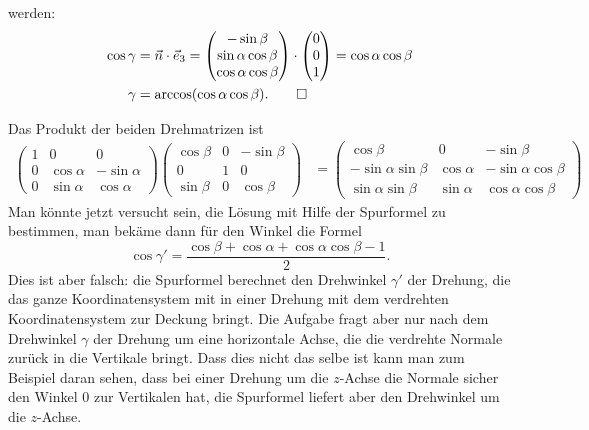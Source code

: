 \begin{loesung}
werden:
\begin{align*}
\cos\gamma
&=
\vec n\cdot\vec e_3=
\begin{pmatrix}
-\sin\beta\\
\sin\alpha\cos\beta\\
\cos\alpha\cos\beta
\end{pmatrix}
\cdot
\begin{pmatrix}0\\0\\1\end{pmatrix}=\cos\alpha\cos\beta
\\
\gamma&=\arccos(\cos\alpha\cos\beta).
\qedhere
\end{align*}
\end{loesung}

\begin{diskussion}
Das Produkt der beiden Drehmatrizen ist
\begin{align*}
\begin{pmatrix}
1&0&0\\
0&\cos\alpha&-\sin\alpha\\
0&\sin\alpha& \cos\alpha
\end{pmatrix}
\begin{pmatrix}
\cos\beta&0&-\sin\beta\\
0&1&0\\
\sin\beta&0&\cos\beta
\end{pmatrix}
&=
\begin{pmatrix}
\cos\beta           &0         &-\sin\beta\\
-\sin\alpha\sin\beta&\cos\alpha&-\sin\alpha\cos\beta\\
 \sin\alpha\sin\beta&\sin\alpha&\cos\alpha\cos\beta
\end{pmatrix}
\end{align*}
Man könnte jetzt versucht sein, die Lösung mit Hilfe der Spurformel
zu bestimmen, man bekäme dann für den Winkel die Formel
\[
\cos\gamma' = \frac{\cos\beta+\cos\alpha+\cos\alpha\cos\beta-1}{2}.
\]
Dies ist aber falsch: die Spurformel berechnet den Drehwinkel $\gamma'$
der Drehung,
die das ganze Koordinatensystem mit in einer Drehung mit dem verdrehten
Koordinatensystem zur Deckung bringt. Die Aufgabe fragt aber nur
nach dem Drehwinkel $\gamma$ der Drehung um eine horizontale Achse,
die die verdrehte Normale
zurück in die Vertikale bringt. Dass dies nicht das selbe ist kann
man zum Beispiel daran sehen, dass bei einer Drehung um die $z$-Achse 
die Normale sicher den Winkel 0 zur Vertikalen hat, die Spurformel
liefert aber den Drehwinkel um die $z$-Achse.
\end{diskussion}

